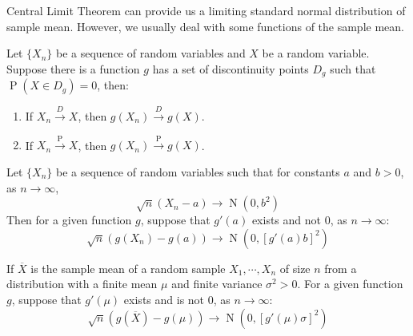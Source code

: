 \documentclass{huhtakm-template-book-v2}
\DeclareMathOperator{\prob}{P}
\DeclareMathOperator{\N}{N}
\begin{document}
Central Limit Theorem can provide us a limiting standard normal distribution of sample mean. However, we usually deal with some functions of the sample mean.
\begin{thm}
	Let $\{X_{n}\}$ be a sequence of random variables and $X$ be a random variable. Suppose there is a function $g$ has a set of discontinuity points $D_{g}$ such that $\prob(X\in D_{g})=0$, then:
	\begin{enumerate}
		\item If $X_{n}\xrightarrow{D}X$, then $g(X_{n})\xrightarrow{D}g(X)$.
		\item If $X_{n}\xrightarrow{\prob}X$, then $g(X_{n})\xrightarrow{\prob}g(X)$.
	\end{enumerate}
\end{thm}
\begin{thm}
	Let $\{X_{n}\}$ be a sequence of random variables such that for constants $a$ and $b>0$, as $n\to\infty$,
	\begin{equation*}
		\sqrt{n}(X_{n}-a)\to\N(0,b^{2})
	\end{equation*}
	Then for a given function $g$, suppose that $g'(a)$ exists and not $0$, as $n\to\infty$:
	\begin{equation*}
		\sqrt{n}(g(X_{n})-g(a))\to\N(0,[g'(a)b]^{2})
	\end{equation*}
\end{thm}
\begin{cor}
	\label{Chapter 1 (Corollary) CLT for functions of random variables}
	If $\overline{X}$ is the sample mean of a random sample $X_{1},\cdots,X_{n}$ of size $n$ from a distribution with a finite mean $\mu$ and finite variance $\sigma^{2}>0$. For a given function $g$, suppose that $g'(\mu)$ exists and is not $0$, as $n\to\infty$:
	\begin{equation*}
		\sqrt{n}(g(\overline{X})-g(\mu))\to\N(0,[g'(\mu)\sigma]^{2})
	\end{equation*}  
\end{cor}
\end{document}

